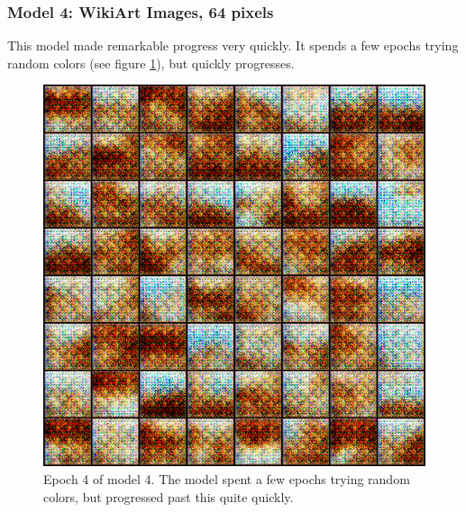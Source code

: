 \documentclass[11pt,letterpaper]{article}
\begin{document}
			\subsubsection{Model 4: WikiArt Images, 64 pixels}
				This model made remarkable progress very quickly.
				It spends a few epochs trying random colors (see figure \ref{fig:wa64:epoch004generator}), but quickly progresses.
				\begin{figure}
					\centering
					\includegraphics[width=1.0\linewidth]{results/model4/epoch004_generator}
					\caption{Epoch 4 of model 4. The model spent a few epochs trying random colors, but progressed past this quite quickly.}
					\label{fig:wa64:epoch004generator}
				\end{figure}
\end{document}
